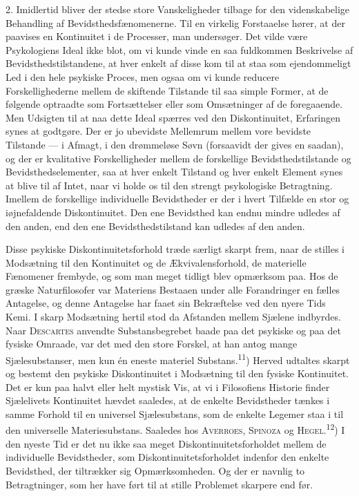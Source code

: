 \documentclass[12pt,a4paper,openany]{book}
\newcommand{\opage}[1]{\marginnote{\footnotesize\textit{[#1]}}}
\begin{document}
2. Imidlertid bliver der stedse store Vanskeligheder tilbage for den
videnskabelige Behandling af Bevidsthedsfænomenerne. Til en virkelig
Forstaaelse hører, at der paavises en Kontinuitet i de Processer, man
undersøger. Det vilde være Psykologiens Ideal ikke blot, om vi kunde vinde en
saa fuldkommen Beskrivelse af Bevidsthedstilstandene, at hver enkelt af disse
kom til at staa som ejendommeligt Led i den hele psykiske Proces, men ogsaa om
vi kunde reducere Forskellighederne mellem de skiftende Tilstande til saa
simple Former, at de følgende optraadte som Fortsættelser eller som Omsætninger
af de foregaaende. Men Udsigten til at naa dette Ideal spærres ved den
Diskontinuitet, Erfaringen synes at godtgøre. Der er jo ubevidste Mellemrum
mellem vore bevidste Tilstande --- i Afmagt, i den drømmeløse Søvn (forsaavidt
der gives en saadan), og der er kvalitative Forskelligheder mellem de
forskellige Bevidsthedstilstande og Bevidsthedselementer, saa at hver enkelt
Tilstand og hver enkelt Element synes at blive til af Intet, naar vi holde os
til den strengt psykologiske Betragtning. Imellem de forskellige individuelle
Bevidstheder er der i hvert Tilfælde en stor
\opage{13}og iøjnefaldende Diskontinuitet. Den ene Bevidsthed kan endnu mindre
udledes af den anden, end den ene Bevidsthedstilstand kan udledes af den anden.

Disse psykiske Diskontinuitetsforhold træde særligt skarpt frem, naar de
stilles i Modsætning til den Kontinuitet og de Ækvivalensforhold, de materielle
Fænomener frembyde, og som man meget tidligt blev opmærksom paa. Hos de græske
Naturfilosofer var Materiens Bestaaen under alle Forandringer en fælles
Antagelse, og denne Antagelse har faaet sin Bekræftelse ved den nyere Tids
Kemi. I skarp Modsætning hertil stod da Afstanden mellem Sjælene indbyrdes.
Naar \textsc{Descartes} anvendte Substansbegrebet baade paa det psykiske og paa
det fysiske Omraade, var det med den store Forskel, at han antog mange
Sjælesubstanser, men kun én eneste materiel Substans.\textsuperscript{11})
Herved udtaltes skarpt og bestemt den psykiske Diskontinuitet i Modsætning til
den fysiske Kontinuitet. Det er kun paa halvt eller helt mystisk Vis, at vi i
Filosofiens Historie finder Sjælelivets Kontinuitet hævdet saaledes, at de
enkelte Bevidstheder tænkes i samme Forhold til en universel Sjælesubstans, som
de enkelte Legemer staa i til den universelle Materiesubstans. Saaledes hos
\textsc{Averroes, Spinoza} og \textsc{Hegel}.\textsuperscript{12}) I den nyeste
Tid er det nu ikke saa meget Diskontinuitetsforholdet mellem de individuelle
Bevidstheder, som Diskontinuitetsforholdet indenfor den enkelte Bevidsthed, der
tiltrækker sig Opmærksomheden. Og der er navnlig to Betragtninger, som her have
ført til at stille Problemet skarpere end før.
\end{document}
